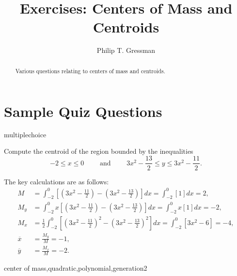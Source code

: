 \documentclass{ximera}
\title{Exercises: Centers of Mass and Centroids}
\author{Philip T. Gressman}
\begin{document}
\begin{abstract}
Various questions relating to centers of mass and centroids.
\end{abstract}
\maketitle


\section*{Sample Quiz Questions}
\begin{question}[CentroidQuad01]
\begin{type}
multiplechoice
\end{type}
Compute the centroid of the region bounded by the inequalities \[-2 \leq x \leq 0 \qquad \text{ and } \qquad {3x^2-\frac{13}{2}} \leq y \leq {3x^2-\frac{11}{2}}.\]
\begin{multiplechoice}
\end{multiplechoice}
\begin{feedback}
The key calculations are as follows: 
\[ \begin{aligned}
M & = \int_{-2}^{0} \left[ \left({3x^2-\frac{11}{2}}\right) - \left({3x^2-\frac{13}{2}}\right) \right] dx = \int_{-2}^{0} \left[{1}\right] dx = 2, \\
M_y & = \int_{-2}^{0} x \left[ \left({3x^2-\frac{11}{2}}\right) - \left({3x^2-\frac{13}{2}}\right) \right] dx = \int_{-2}^{0} x \left[{1}\right] dx = -2, \\
M_x & = \frac{1}{2} \int_{-2}^{0} \left[ \left({3x^2-\frac{11}{2}}\right)^2 - \left({3x^2-\frac{13}{2}}\right)^2 \right] dx = \int_{-2}^{0} \left[{3x^2-6}\right] = -4, \\
 \overline{x} &  = \frac{M_y}{M} = -1, \\
 \overline{y} &  = \frac{M_x}{M} = -2.\end{aligned}\]
\end{feedback}
\begin{keywords}
center of mass,quadratic,polynomial,generation2
\end{keywords}
\end{question}
\end{document}
